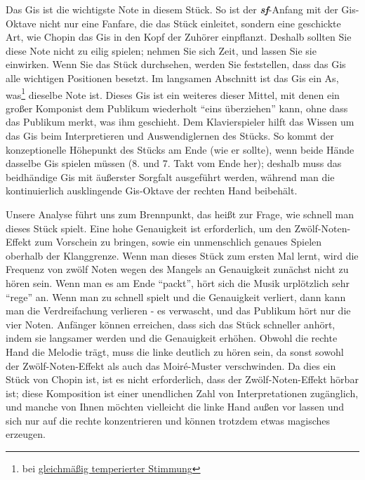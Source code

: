 Das Gis ist die wichtigste Note in diesem Stück.
So ist der \textit{\textbf{sf}}-Anfang mit der Gis-Oktave nicht nur eine Fanfare, die das Stück einleitet, sondern eine geschickte Art, wie Chopin das Gis in den Kopf der Zuhörer einpflanzt.
Deshalb sollten Sie diese Note nicht zu eilig spielen; nehmen Sie sich Zeit, und lassen Sie sie einwirken.
Wenn Sie das Stück durchsehen, werden Sie feststellen, dass das Gis alle wichtigen Positionen besetzt.
Im langsamen Abschnitt ist das Gis ein As, was\footnote{bei \hyperlink{et1}{gleichmäßig temperierter Stimmung}} dieselbe Note ist.
Dieses Gis ist ein weiteres dieser Mittel, mit denen ein großer Komponist dem Publikum wiederholt \enquote{eins überziehen} kann, ohne dass das Publikum merkt, was ihm geschieht.
Dem Klavierspieler hilft das Wissen um das Gis beim Interpretieren und Auswendiglernen des Stücks.
So kommt der konzeptionelle Höhepunkt des Stücks am Ende (wie er sollte), wenn beide Hände dasselbe Gis spielen müssen (8. und 7. Takt vom Ende her); deshalb muss das beidhändige Gis mit äußerster Sorgfalt ausgeführt werden, während man die kontinuierlich ausklingende Gis-Oktave der rechten Hand beibehält.

Unsere Analyse führt uns zum Brennpunkt, das heißt zur Frage, wie schnell man dieses Stück spielt.
Eine hohe Genauigkeit ist erforderlich, um den Zwölf-Noten-Effekt zum Vorschein zu bringen, sowie ein unmenschlich genaues Spielen oberhalb der Klanggrenze.
Wenn man dieses Stück zum ersten Mal lernt, wird die Frequenz von zwölf Noten wegen des Mangels an Genauigkeit zunächst nicht zu hören sein.
Wenn man es am Ende \enquote{packt}, hört sich die Musik urplötzlich sehr \enquote{rege} an.
Wenn man zu schnell spielt und die Genauigkeit verliert, dann kann man die Verdreifachung verlieren -  es verwascht, und das Publikum hört nur die vier Noten.
Anfänger können erreichen, dass sich das Stück schneller anhört, indem sie langsamer werden und die Genauigkeit erhöhen.
Obwohl die rechte Hand die Melodie trägt, muss die linke deutlich zu hören sein, da sonst sowohl der Zwölf-Noten-Effekt als auch das Moiré-Muster verschwinden.
Da dies ein Stück von Chopin ist, ist es nicht erforderlich, dass der Zwölf-Noten-Effekt hörbar ist; diese Komposition ist einer unendlichen Zahl von Interpretationen zugänglich, und manche von Ihnen möchten vielleicht die linke Hand außen vor lassen und sich nur auf die rechte konzentrieren und können trotzdem etwas magisches erzeugen.

